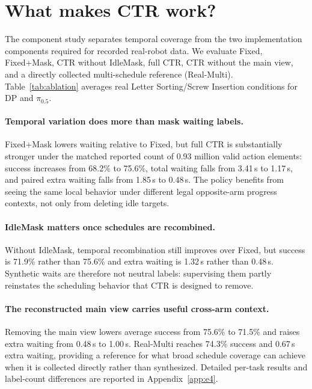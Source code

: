 \documentclass{article}
\newcommand{\method}{CTR}
\begin{document}
\section{What makes CTR work?}
The component study separates temporal coverage from the two implementation components required for recorded real-robot data. We evaluate Fixed, Fixed+Mask, \method{} without IdleMask, full \method{}, \method{} without the main view, and a directly collected multi-schedule reference (Real-Multi). Table~\ref{tab:ablation} averages real Letter Sorting/Screw Insertion conditions for DP and $\pi_{0.5}$.

\begin{table}[t]
\caption{Real-robot component study on Letter Sorting and Screw Insertion with DP and $\pi_{0.5}$. Labels is the reported number of valid supervised action elements in millions; $W$ is waiting (s), $M$ post-completion motion (cm), and $\Delta W$ paired extra waiting (s).}
\label{tab:ablation}
\centering\small\setlength{\tabcolsep}{4pt}

\end{table}

\paragraph{Temporal variation does more than mask waiting labels.}
Fixed+Mask lowers waiting relative to Fixed, but full \method{} is substantially stronger under the matched reported count of 0.93 million valid action elements: success increases from 68.2\% to 75.6\%, total waiting falls from 3.41\,s to 1.17\,s, and paired extra waiting falls from 1.85\,s to 0.48\,s. The policy benefits from seeing the same local behavior under different legal opposite-arm progress contexts, not only from deleting idle targets.

\paragraph{IdleMask matters once schedules are recombined.}
Without IdleMask, temporal recombination still improves over Fixed, but success is 71.9\% rather than 75.6\% and extra waiting is 1.32\,s rather than 0.48\,s. Synthetic waits are therefore not neutral labels: supervising them partly reinstates the scheduling behavior that \method{} is designed to remove.

\paragraph{The reconstructed main view carries useful cross-arm context.}
Removing the main view lowers average success from 75.6\% to 71.5\% and raises extra waiting from 0.48\,s to 1.00\,s. Real-Multi reaches 74.3\% success and 0.67\,s extra waiting, providing a reference for what broad schedule coverage can achieve when it is collected directly rather than synthesized. Detailed per-task results and label-count differences are reported in Appendix~\ref{app:e4}.
\end{document}
